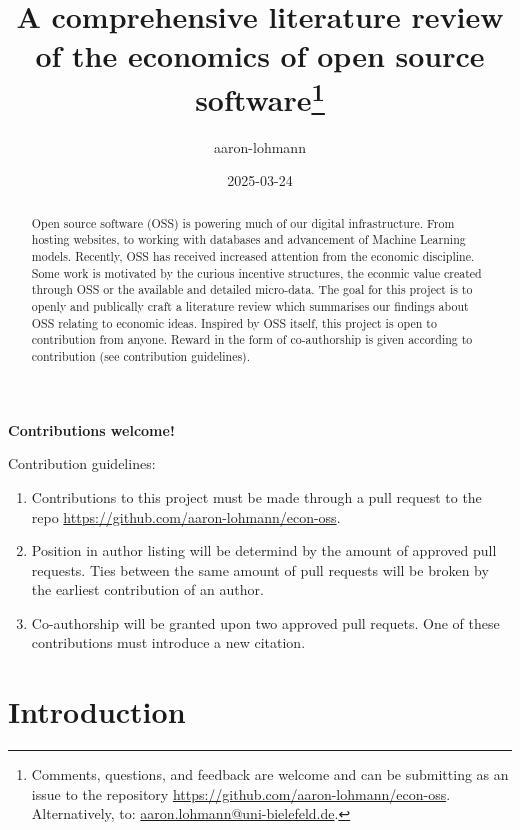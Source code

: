 \documentclass[
  12pt,
]{article}
\title{A comprehensive literature review of the economics of open source
software\thanks{Comments, questions, and feedback are welcome and can be
submitting as an issue to the repository
\href{https://github.com/aaron-lohmann/econ-oss/issues}{https://github.com/aaron-lohmann/econ-oss}.
Alternatively, to:
\href{aaron.lohmann@uni-bielefeld.de}{aaron.lohmann@uni-bielefeld.de}.}}
\author{aaron-lohmann}
\date{2025-03-24}
\providecommand{\tightlist}{%
  \setlength{\itemsep}{0pt}\setlength{\parskip}{0pt}}\usepackage{longtable,booktabs,array}
\begin{document}
\maketitle
\begin{abstract}
Open source software (OSS) is powering much of our digital
infrastructure. From hosting websites, to working with databases and
advancement of Machine Learning models. Recently, OSS has received
increased attention from the economic discipline. Some work is motivated
by the curious incentive structures, the econmic value created through
OSS or the available and detailed micro-data. The goal for this project
is to openly and publically craft a literature review which summarises
our findings about OSS relating to economic ideas. Inspired by OSS
itself, this project is open to contribution from anyone. Reward in the
form of co-authorship is given according to contribution (see
contribution guidelines).
\end{abstract}

\begin{center}
\bf{Contributions welcome!}
\end{center}

Contribution guidelines:

\begin{enumerate}
\def\labelenumi{\arabic{enumi}.}
\tightlist
\item
  Contributions to this project must be made through a pull request to
  the repo \url{https://github.com/aaron-lohmann/econ-oss}.
\item
  Position in author listing will be determind by the amount of approved
  pull requests. Ties between the same amount of pull requests will be
  broken by the earliest contribution of an author.
\item
  Co-authorship will be granted upon two approved pull requets. One of
  these contributions must introduce a new citation.
\end{enumerate}

\newpage

\section{Introduction}\label{sec-introduction}
\end{document}
